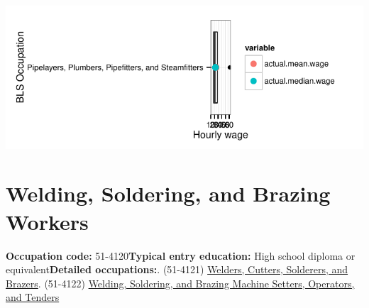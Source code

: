 \documentclass[a4paper,10pt]{article}\usepackage[]{graphicx}\usepackage[]{color}
\makeatletter
\def\maxwidth{ %
  \ifdim\Gin@nat@width>\linewidth
    \linewidth
  \else
    \Gin@nat@width
  \fi
}
\makeatother
\begin{document}
{\centering \includegraphics[width=\maxwidth]{figure/unnamed-chunk-288} 

}


\newpage\section{Welding, Soldering, and Brazing Workers}\textbf{Occupation code:} 51-4120\newline\textbf{Typical entry education:} High school diploma or equivalent\newline\textbf{Detailed occupations:}. (51-4121)  \href{http://www.bls.gov/oes/current/oes514121.htm}{Welders, Cutters, Solderers, and Brazers}. (51-4122)  \href{http://www.bls.gov/oes/current/oes514122.htm}{Welding, Soldering, and Brazing Machine Setters, Operators, and Tenders}\newline%
\end{document}
